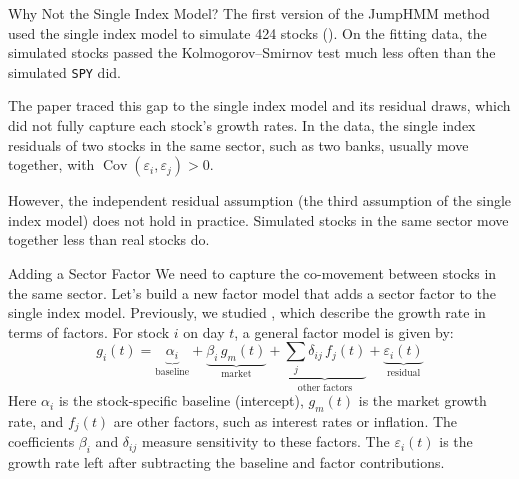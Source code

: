 \documentclass[aspectratio=169,11pt]{beamer}
\begin{document}
\begin{frame}{Why Not the Single Index Model?}
  The first version of the JumpHMM method used the single index model to simulate 424 stocks
  (\href{https://arxiv.org/abs/2603.10202}{}). On the fitting
  data, the simulated stocks passed the Kolmogorov–Smirnov test much less often than the simulated
  \texttt{SPY} did.

  \vspace{0.6em}
  The paper traced this gap to the single index model and its residual draws, which did not fully
  capture each stock's growth rates. In the data, the single index residuals of two stocks in the
  same sector, such as two banks, usually move together, with
  $\operatorname{Cov}(\varepsilon_i,\varepsilon_j)>0$.

  \vspace{0.6em}
  However, the independent residual assumption (the third assumption of the single index model)
  does not hold in practice. Simulated stocks in the same sector move together less than real
  stocks do.
\end{frame}

\begin{frame}{Adding a Sector Factor}
  We need to capture the co-movement between stocks in the same sector. Let's build a new factor
  model that adds a sector factor to the single index model. Previously, we studied
  , which describe the growth rate in terms of factors. For stock $i$ on day
  $t$, a general factor model is given by:
  \begin{equation*}
    g_{i}(t)=\underbrace{\alpha_{i}}_{\textstyle\text{baseline}}+\underbrace{\beta_{i}\,g_{m}(t)}_{\textstyle\text{market}}+\underbrace{\textstyle\sum_{j}\delta_{ij}\,f_{j}(t)}_{\textstyle\text{other factors}}+\underbrace{\varepsilon_{i}(t)}_{\textstyle\text{residual}}
  \end{equation*}
  Here $\alpha_i$ is the stock-specific baseline (intercept), $g_m(t)$ is the market growth rate, and
  $f_j(t)$ are other factors, such as interest rates or inflation. The coefficients $\beta_i$
  and $\delta_{ij}$ measure sensitivity to these factors. The 
  $\varepsilon_i(t)$ is the growth rate left after subtracting the baseline and factor contributions.
\end{frame}
\end{document}
